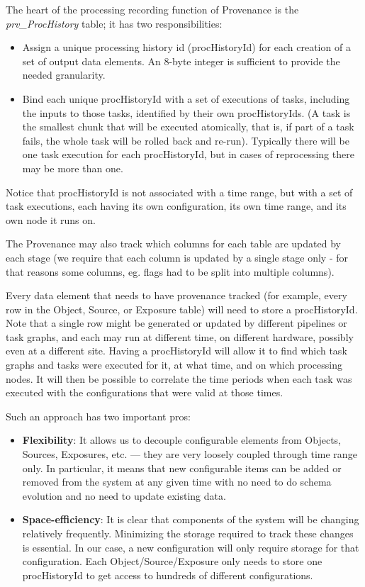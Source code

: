 \documentclass[DM,lsstdraft,toc]{lsstdoc}
\begin{document}
The heart of the processing recording function of Provenance is the \textit{prv\_ProcHistory} table; it has two responsibilities:

\begin{itemize}
  \item Assign a unique processing history id (procHistoryId) for each creation of a set of output data elements. An 8-byte integer is sufficient to provide the needed granularity.
  \item Bind each unique procHistoryId with a set of executions of tasks, including the inputs to those tasks, identified by their own procHistoryIds. (A task is the smallest chunk that will be executed atomically, that is, if part of a task fails, the whole task will be rolled back and re-run). Typically there will be one task execution for each procHistoryId, but in cases of reprocessing there may be more than one.
\end{itemize}

Notice that procHistoryId is not associated with a time range, but with a set of task executions, each having its own configuration, its own time range, and its own node it runs on.

The Provenance may also track which columns for each table are updated by each stage (we require that each column is updated by a single stage only - for that reasons some columns, eg. flags had to be split into multiple columns).

Every data element that needs to have provenance tracked (for example, every row in the Object, Source, or Exposure table) will need to store a procHistoryId. Note that a single row might be generated or updated by different pipelines or task graphs, and each may run at different time, on different hardware, possibly even at a different site. Having a procHistoryId will allow it to find which task graphs and tasks were executed for it, at what time, and on which processing nodes. It will then be possible to correlate the time periods when each task was executed with the configurations that were valid at those times.

Such an approach has two important pros:

\begin{itemize}
  \item \textbf{Flexibility}: It allows us to decouple configurable elements from Objects, Sources, Exposures, etc. --- they are very loosely coupled through time range only. In particular, it means that new configurable items can be added or removed from the system at any given time with no need to do schema evolution and no need to update existing data.

  \item \textbf{Space-efficiency}: It is clear that components of the system will be changing relatively frequently. Minimizing the storage required to track these changes is essential. In our case, a new configuration will only require storage for that configuration. Each Object/Source/Exposure only needs to store one procHistoryId to get access to hundreds of different configurations.
\end{itemize}
\end{document}
